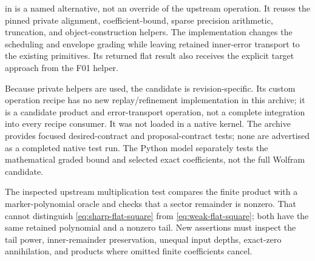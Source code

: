  in  is a named alternative, not an override of the upstream operation. It reuses the pinned private alignment, coefficient-bound, sparse precision arithmetic, truncation, and object-construction helpers. The implementation changes the scheduling and envelope grading while leaving retained inner-error transport to the existing primitives. Its returned flat result also receives the explicit target approach from the F01 helper.

Because private helpers are used, the candidate is revision-specific. Its custom operation recipe has no new replay/refinement implementation in this archive; it is a candidate product and error-transport operation, not a complete integration into every recipe consumer. It was not loaded in a native kernel. The archive provides focused desired-contract and proposal-contract tests; none are advertised as a completed native test run. The Python model separately tests the mathematical graded bound and selected exact coefficients, not the full Wolfram candidate.

The inspected upstream multiplication test compares the finite product with a marker-polynomial oracle and checks that a sector remainder is nonzero. That cannot distinguish \eqref{eq:sharp-flat-square} from \eqref{eq:weak-flat-square}; both have the same retained polynomial and a nonzero tail. New assertions must inspect the tail power, inner-remainder preservation, unequal input depths, exact-zero annihilation, and products where omitted finite coefficients cancel.\cite{flattests}
